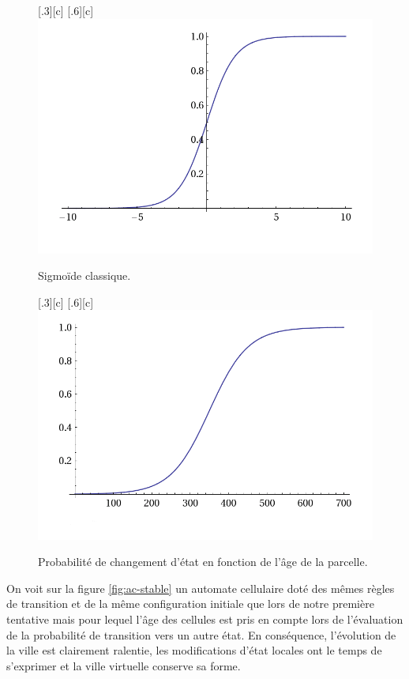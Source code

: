\documentclass[10pt]{article}
\begin{document}
\begin{figure}[H]
  \centering
  \subcaptionbox{}[.3\linewidth][c]{
  }
  \subcaptionbox{}[.6\linewidth][c]{
    \includegraphics[width=.6\linewidth]{images/sigmoid.png}
  }
  \caption{Sigmoïde classique.}
  \label{fig:sigmoide1}
\end{figure}

\begin{figure}[H]
  \centering
  \subcaptionbox{}[.3\linewidth][c]{
  }
  \subcaptionbox{}[.6\linewidth][c]{
    \includegraphics[width=.6\linewidth]{images/sigmoid-age.png}
  }
  \caption{Probabilité de changement d'état en fonction de l'âge de la
    parcelle.}
  \label{fig:sigmoide2}
\end{figure}

On voit sur la figure \ref{fig:ac-stable} un automate cellulaire doté
des mêmes règles de transition et de la même configuration initiale
que lors de notre première tentative mais pour lequel l'âge des
cellules est pris en compte lors de l'évaluation de la probabilité de
transition vers un autre état. En conséquence, l'évolution de la ville
est clairement ralentie, les modifications d'état locales ont le
temps de s'exprimer et la ville virtuelle conserve sa forme.
\end{document}
